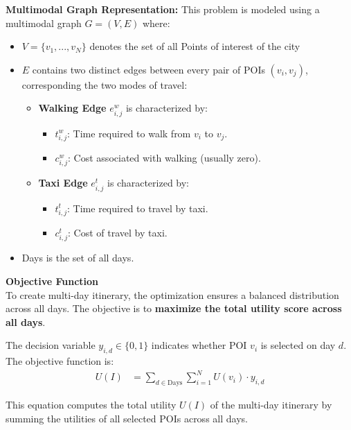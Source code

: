\documentclass[sigconf,authordraft]{acmart}
\begin{document}
\noindent \textbf{Multimodal Graph Representation:}
This problem is modeled using a multimodal graph \( G = (V, E) \) where:

\begin{itemize}
    \item \( V = \{v_1, ..., v_N\} \) denotes the set of all Points of interest of the city
    \item \( E \) contains two distinct edges between every pair of POIs \( (v_i, v_j) \), corresponding the two modes of travel:
    \begin{itemize}
        \item \textbf{Walking Edge} \( e^{w}_{i,j} \) is characterized by:
        \begin{itemize}
            \item \( t^{w}_{i,j} \): Time required to walk from \( v_i \) to \( v_j \).
            \item \( c^{w}_{i,j} \): Cost associated with walking (usually zero).
        \end{itemize}
        \item \textbf{Taxi Edge} \( e^{t}_{i,j} \) is characterized by:
        \begin{itemize}
            \item \( t^{t}_{i,j} \): Time required to travel by taxi.
            \item \( c^{t}_{i,j} \): Cost of travel by taxi.
        \end{itemize}
    \end{itemize}
    \item Days is the set of all days.
\end{itemize}

\noindent \textbf{Objective Function}\\
To create multi-day itinerary, the optimization ensures a balanced distribution across all days. The objective is to \textbf{maximize the total utility score across all days}.

The decision variable \( y_{i,d} \in \{0,1\} \) indicates whether POI \( v_i \) is selected on day \( d \). The objective function is:
\begin{align}
U(I) &= \sum_{d \in \text{Days}} \sum_{i = 1}^{N} U(v_i) \cdot y_{i,d} \label{eq:multi_day_binary}
\end{align}

This equation computes the total utility $U(I)$ of the multi-day itinerary by summing the utilities of all selected POIs across all days.
\end{document}
